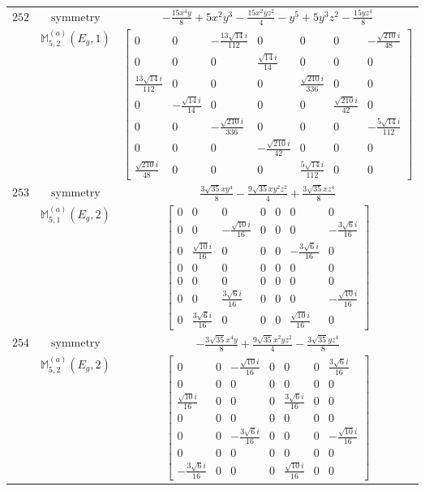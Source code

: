 \documentclass[fleqn,8pt,landscape]{jsarticle}
\begin{document}
\begin{longtable}{ccc}
$ 252 $ & $ \text{symmetry} $ & $ - \frac{15 x^{4} y}{8} + 5 x^{2} y^{3} - \frac{15 x^{2} y z^{2}}{4} - y^{5} + 5 y^{3} z^{2} - \frac{15 y z^{4}}{8} $ \\
$  $ & $ \mathbb{M}_{5,2}^{(a)}(E_{g},1) $ & $ \begin{bmatrix} 0 & 0 & - \frac{13 \sqrt{14} i}{112} & 0 & 0 & 0 & - \frac{\sqrt{210} i}{48} \\ 0 & 0 & 0 & \frac{\sqrt{14} i}{14} & 0 & 0 & 0 \\ \frac{13 \sqrt{14} i}{112} & 0 & 0 & 0 & \frac{\sqrt{210} i}{336} & 0 & 0 \\ 0 & - \frac{\sqrt{14} i}{14} & 0 & 0 & 0 & \frac{\sqrt{210} i}{42} & 0 \\ 0 & 0 & - \frac{\sqrt{210} i}{336} & 0 & 0 & 0 & - \frac{5 \sqrt{14} i}{112} \\ 0 & 0 & 0 & - \frac{\sqrt{210} i}{42} & 0 & 0 & 0 \\ \frac{\sqrt{210} i}{48} & 0 & 0 & 0 & \frac{5 \sqrt{14} i}{112} & 0 & 0 \end{bmatrix} $ \\ \hline
$ 253 $ & $ \text{symmetry} $ & $ \frac{3 \sqrt{35} x y^{4}}{8} - \frac{9 \sqrt{35} x y^{2} z^{2}}{4} + \frac{3 \sqrt{35} x z^{4}}{8} $ \\
$  $ & $ \mathbb{M}_{5,1}^{(a)}(E_{g},2) $ & $ \begin{bmatrix} 0 & 0 & 0 & 0 & 0 & 0 & 0 \\ 0 & 0 & - \frac{\sqrt{10} i}{16} & 0 & 0 & 0 & - \frac{3 \sqrt{6} i}{16} \\ 0 & \frac{\sqrt{10} i}{16} & 0 & 0 & 0 & - \frac{3 \sqrt{6} i}{16} & 0 \\ 0 & 0 & 0 & 0 & 0 & 0 & 0 \\ 0 & 0 & 0 & 0 & 0 & 0 & 0 \\ 0 & 0 & \frac{3 \sqrt{6} i}{16} & 0 & 0 & 0 & - \frac{\sqrt{10} i}{16} \\ 0 & \frac{3 \sqrt{6} i}{16} & 0 & 0 & 0 & \frac{\sqrt{10} i}{16} & 0 \end{bmatrix} $ \\ \hline
$ 254 $ & $ \text{symmetry} $ & $ - \frac{3 \sqrt{35} x^{4} y}{8} + \frac{9 \sqrt{35} x^{2} y z^{2}}{4} - \frac{3 \sqrt{35} y z^{4}}{8} $ \\
$  $ & $ \mathbb{M}_{5,2}^{(a)}(E_{g},2) $ & $ \begin{bmatrix} 0 & 0 & - \frac{\sqrt{10} i}{16} & 0 & 0 & 0 & \frac{3 \sqrt{6} i}{16} \\ 0 & 0 & 0 & 0 & 0 & 0 & 0 \\ \frac{\sqrt{10} i}{16} & 0 & 0 & 0 & \frac{3 \sqrt{6} i}{16} & 0 & 0 \\ 0 & 0 & 0 & 0 & 0 & 0 & 0 \\ 0 & 0 & - \frac{3 \sqrt{6} i}{16} & 0 & 0 & 0 & - \frac{\sqrt{10} i}{16} \\ 0 & 0 & 0 & 0 & 0 & 0 & 0 \\ - \frac{3 \sqrt{6} i}{16} & 0 & 0 & 0 & \frac{\sqrt{10} i}{16} & 0 & 0 \end{bmatrix} $ \\ \hline

\end{longtable}
\end{document}
